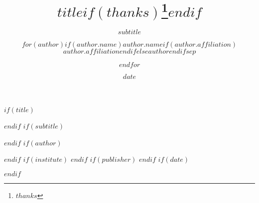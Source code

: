 $if(title)$
\title{$title$$if(thanks)$\thanks{$thanks$}$endif$}
$endif$
$if(subtitle)$
\subtitle{$subtitle$}
$endif$
$if(author)$
\author{$for(author)$$if(author.name)$$author.name$$if(author.affiliation)$ \\ $author.affiliation$$endif$$else$$author$$endif$$sep$ \and $endfor$}
$endif$
$if(institute)$
$endif$
$if(publisher)$
$endif$
$if(date)$
\date{$date$}
$endif$